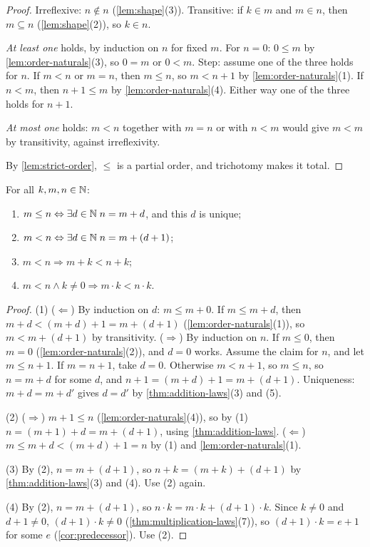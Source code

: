 \begin{proof}
Irreflexive: $n \notin n$ (\cref{lem:shape}(3)). Transitive: if $k \in m$ and $m
\in n$, then $m \subseteq n$ (\cref{lem:shape}(2)), so $k \in n$.

\emph{At least one} holds, by induction on $n$ for fixed $m$. For $n = 0$: $0 \le
m$ by \cref{lem:order-naturals}(3), so $0 = m$ or $0 < m$. Step: assume one of the
three holds for $n$. If $m < n$ or $m = n$, then $m \le n$, so $m < n + 1$ by
\cref{lem:order-naturals}(1). If $n < m$, then $n + 1 \le m$ by
\cref{lem:order-naturals}(4). Either way one of the three holds for $n + 1$.

\emph{At most one} holds: $m < n$ together with $m = n$ or with $n < m$ would give
$m < m$ by transitivity, against irreflexivity.

By \cref{lem:strict-order}, $\le$ is a partial order, and trichotomy makes it
total.
\end{proof}

\begin{theorem}
\label{thm:order-arithmetic}
For all $k, m, n \in \mathbb{N}$:
\begin{enumerate}
  \item $m \le n \Leftrightarrow \exists d \in \mathbb{N}\; n = m + d$, and this $d$ is
    unique;
  \item $m < n \Leftrightarrow \exists d \in \mathbb{N}\; n = m + (d + 1)$;
  \item $m < n \Rightarrow m + k < n + k$;
  \item $m < n \land k \neq 0 \Rightarrow m \cdot k < n \cdot k$.
\end{enumerate}
\end{theorem}

\begin{proof}
(1) ($\Leftarrow$) By induction on $d$: $m \le m + 0$. If $m \le m + d$, then $m +
d < (m + d) + 1 = m + (d + 1)$ (\cref{lem:order-naturals}(1)), so $m < m + (d + 1)$
by transitivity. ($\Rightarrow$) By induction on $n$. If $m \le 0$, then $m = 0$
(\cref{lem:order-naturals}(2)), and $d = 0$ works. Assume the claim for $n$, and
let $m \le n + 1$. If $m = n + 1$, take $d = 0$. Otherwise $m < n + 1$, so $m \le
n$, so $n = m + d$ for some $d$, and $n + 1 = (m + d) + 1 = m + (d + 1)$.
Uniqueness: $m + d = m + d'$ gives $d = d'$ by \cref{thm:addition-laws}(3) and (5).

(2) ($\Rightarrow$) $m + 1 \le n$ (\cref{lem:order-naturals}(4)), so by (1) $n = (m
+ 1) + d = m + (d + 1)$, using \cref{thm:addition-laws}. ($\Leftarrow$) $m \le m +
d < (m + d) + 1 = n$ by (1) and \cref{lem:order-naturals}(1).

(3) By (2), $n = m + (d + 1)$, so $n + k = (m + k) + (d + 1)$ by
\cref{thm:addition-laws}(3) and (4). Use (2) again.

(4) By (2), $n = m + (d + 1)$, so $n \cdot k = m \cdot k + (d + 1) \cdot k$. Since
$k \neq 0$ and $d + 1 \neq 0$, $(d + 1) \cdot k \neq 0$
(\cref{thm:multiplication-laws}(7)), so $(d + 1) \cdot k = e + 1$ for some $e$
(\cref{cor:predecessor}). Use (2).
\end{proof}

